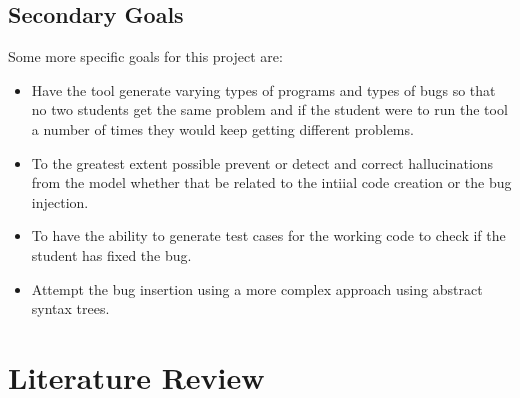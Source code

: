 \documentclass[12pt]{extarticle}
\begin{document}
\subsection{Secondary Goals}

Some more specific goals for this project are:
\begin{itemize}
    \item Have the tool generate varying types of programs and types of bugs so that no two students get the same problem and if the student were to run the tool a number of times they would keep getting different problems.
    \item To the greatest extent possible prevent or detect and correct hallucinations from the model whether that be related to the intiial code creation or the bug injection.
    \item To have the ability to generate test cases for the working code to check if the student has fixed the bug.
    \item Attempt the bug insertion using a more complex approach using abstract syntax trees.
\end{itemize}

\section{Literature Review}
\end{document}
